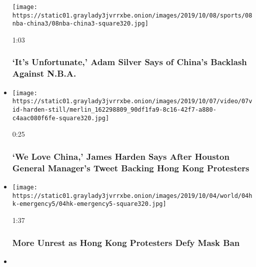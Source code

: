 \begin{itemize}
  \texttt{[image: https://static01.graylady3jvrrxbe.onion/images/2019/10/08/sports/08nba-china3/08nba-china3-square320.jpg]}

  1:03

  \hypertarget{its-unfortunate-adam-silver-says-of-chinas-backlash-against-nba}{%
  \subsubsection{`It's Unfortunate,' Adam Silver Says of China's
  Backlash Against
  N.B.A.}\label{its-unfortunate-adam-silver-says-of-chinas-backlash-against-nba}}
\item
  \href{https://www.nytimes3xbfgragh.onion/video/sports/basketball/100000006755297/james-harden-china-apology.html?action=click\&module=video-series-bar\&region=header\&pgtype=Article\&playlistId=video/hk-protest}{}

  \texttt{[image: https://static01.graylady3jvrrxbe.onion/images/2019/10/07/video/07vid-harden-still/merlin\_162298809\_90df1fa9-8c16-42f7-a880-c4aac080f6fe-square320.jpg]}

  0:25

  \hypertarget{we-love-china-james-harden-says-after-houston-general-managers-tweet-backing-hong-kong-protesters}{%
  \subsubsection{`We Love China,' James Harden Says After Houston
  General Manager's Tweet Backing Hong Kong
  Protesters}\label{we-love-china-james-harden-says-after-houston-general-managers-tweet-backing-hong-kong-protesters}}
\item
  \href{https://www.nytimes3xbfgragh.onion/video/world/asia/100000006751868/hong-kong-mask-ban.html?action=click\&module=video-series-bar\&region=header\&pgtype=Article\&playlistId=video/hk-protest}{}

  \texttt{[image: https://static01.graylady3jvrrxbe.onion/images/2019/10/04/world/04hk-emergency5/04hk-emergency5-square320.jpg]}

  1:37

  \hypertarget{more-unrest-as-hong-kong-protesters-defy-mask-ban}{%
  \subsubsection{More Unrest as Hong Kong Protesters Defy Mask
  Ban}\label{more-unrest-as-hong-kong-protesters-defy-mask-ban}}
\item
  \href{https://www.nytimes3xbfgragh.onion/video/world/asia/100000006745719/hong-kong-protester-shot.html?action=click\&module=video-series-bar\&region=header\&pgtype=Article\&playlistId=video/hk-protest}{}


\end{itemize}
